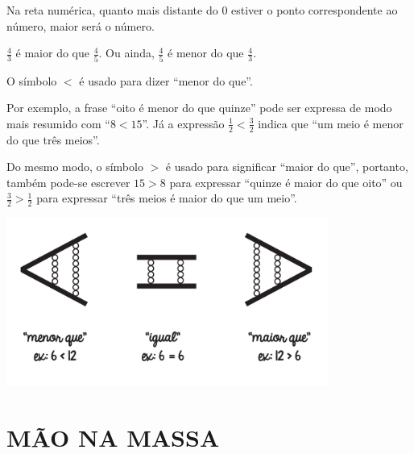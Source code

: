 Na reta numérica, quanto mais distante do 0 estiver o ponto correspondente ao número, maior será o número.
\begin{center}
\end{center}

$\frac{4}{3}$ é maior do que $\frac{4}{5}$. Ou ainda, $\frac{4}{5}$ é menor do que $\frac{4}{3}$.


O símbolo $<$ é usado para dizer ``menor do que''.

Por exemplo, a frase ``oito é menor do que quinze'' pode ser expressa de modo mais resumido com ``$8<15$''. Já a expressão $\frac{1}{2}<\frac{3}{2}$ indica que ``um meio é menor do que três meios''.

Do mesmo modo, o símbolo $>$ é usado para significar ``maior do que'', portanto, também pode-se escrever $15>8$ para expressar ``quinze é maior do que oito'' ou $\frac{3}{2}>\frac{1}{2}$  para expressar ``três meios é maior do que um meio''.
\begin{center}
  \includegraphics[width=300pt, keepaspectratio]{../figuras/licao03/orgideias_fig05.png}
\end{center}

\section{MÃO NA MASSA }

